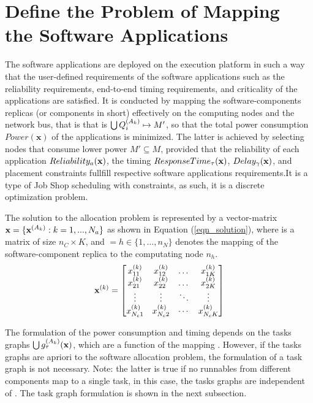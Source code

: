 \section{Define the Problem of Mapping the Software Applications}\label{sec_problem}
The software applications are deployed on the execution platform in such a way that the user-defined requirements of the software applications such as the reliability requirements, end-to-end timing requirements, and criticality of the applications are satisfied. It is conducted by mapping the software-components replicas (or components in short) effectively on the computing nodes and the network bus, that is that is $\bigcup {\sss{Q}}\mapsto M'$, so that the total power consumption $Power(\textbf{x})$ of the applications is minimized. The latter  is achieved by selecting nodes that consume lower power $M'\subseteq M$, provided that the reliability of each application $Reliability_a(\textbf{x})$, the timing $ResponseTime_\tau(\textbf{x})$, $Delay_\gamma(\textbf{x})$, and placement constraints fullfill respective software applications requirements.It is a type of Job Shop scheduling with constraints, as such, it is a discrete optimization problem. 

The solution to the allocation problem is represented by a vector-matrix $\textbf{x}=\{\textbf{x}^{(A_k)}:k=1,...,N_a\}$ as shown in Equation (\ref{eqn_solution}), where  is a matrix of size $n_C\times K$, and $=h\in \{1,…,n_N\}$ denotes the mapping of the  software-component replica  to the computating node $n_h$.
\begin{equation}
\label{eqn_solution}
\textbf{x}^{(k)}=
\begin{bmatrix} 
x^{(k)}_{11} & x^{(k)}_{12} & \dots & x^{(k)}_{1K}\\
x^{(k)}_{21} & x^{(k)}_{22} & \dots & x^{(k)}_{2K}\\
\vdots & \vdots & \ddots & \vdots\\
x^{(k)}_{N_c1} & x^{(k)}_{N_c2} & \cdots & x^{(k)}_{N_cK}
\end{bmatrix}
\end{equation}

The formulation of the power consumption and timing depends on the tasks graphs $\bigcup\sss{g}[k][\tau](\x)$, which are a function of the mapping \ttx. However, if the tasks graphs are apriori to the software allocation problem, the formulation of a task graph is not necessary. Note: the latter is true if no runnables from different components map to a single task, in this case, the tasks graphs are independent of \ttx. The task graph formulation is shown in the next subsection.

